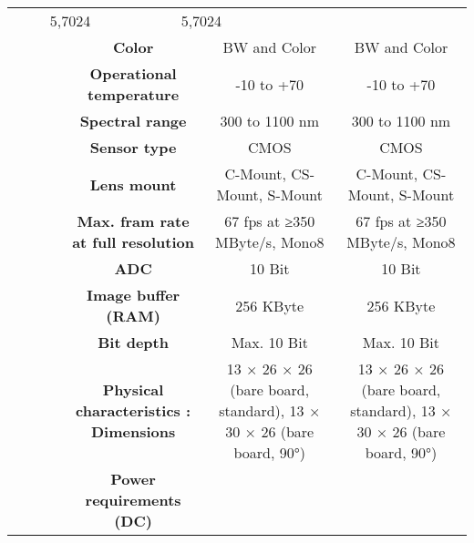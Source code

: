 \begin{table}[H]
{\begin{tabular}{ccc|cc|cc|}
  \multicolumn{2}{c|}{5,7024} &
  \multicolumn{2}{c|}{5,7024} \\
\multicolumn{1}{|c|}{} &
  \multicolumn{2}{c|}{\cellcolor[HTML]{EFEFEF}\textbf{Color}} &
  \multicolumn{2}{c|}{\cellcolor[HTML]{EFEFEF}BW and Color} &
  \multicolumn{2}{c|}{\cellcolor[HTML]{EFEFEF}BW and Color} \\
\multicolumn{1}{|c|}{} &
  \multicolumn{2}{c|}{\textbf{Operational temperature}} &
  \multicolumn{2}{c|}{-10 to +70} &
  \multicolumn{2}{c|}{-10 to +70} \\
\multicolumn{1}{|c|}{} &
  \multicolumn{2}{c|}{\cellcolor[HTML]{EFEFEF}\textbf{Spectral range}} &
  \multicolumn{2}{c|}{\cellcolor[HTML]{EFEFEF}300 to 1100 nm} &
  \multicolumn{2}{c|}{\cellcolor[HTML]{EFEFEF}300 to 1100 nm} \\
\multicolumn{1}{|c|}{} &
  \multicolumn{2}{c|}{\textbf{Sensor type}} &
  \multicolumn{2}{c|}{CMOS} &
  \multicolumn{2}{c|}{CMOS} \\
\multicolumn{1}{|c|}{} &
  \multicolumn{2}{c|}{\cellcolor[HTML]{EFEFEF}\textbf{Lens mount}} &
  \multicolumn{2}{c|}{\cellcolor[HTML]{EFEFEF}C-Mount, CS-Mount, S-Mount} &
  \multicolumn{2}{c|}{\cellcolor[HTML]{EFEFEF}C-Mount, CS-Mount, S-Mount} \\
\multicolumn{1}{|c|}{} &
  \multicolumn{2}{c|}{\textbf{Max. fram rate at full resolution}} &
  \multicolumn{2}{c|}{67 fps at ≥350 MByte/s, Mono8} &
  \multicolumn{2}{c|}{67 fps at ≥350 MByte/s, Mono8} \\
\multicolumn{1}{|c|}{} &
  \multicolumn{2}{c|}{\cellcolor[HTML]{EFEFEF}\textbf{ADC}} &
  \multicolumn{2}{c|}{\cellcolor[HTML]{EFEFEF}10 Bit} &
  \multicolumn{2}{c|}{\cellcolor[HTML]{EFEFEF}10 Bit} \\
\multicolumn{1}{|c|}{} &
  \multicolumn{2}{c|}{\textbf{Image buffer (RAM)}} &
  \multicolumn{2}{c|}{256 KByte} &
  \multicolumn{2}{c|}{256 KByte} \\
\multicolumn{1}{|c|}{} &
  \multicolumn{2}{c|}{\cellcolor[HTML]{EFEFEF}\textbf{Bit depth}} &
  \multicolumn{2}{c|}{\cellcolor[HTML]{EFEFEF}Max. 10 Bit} &
  \multicolumn{2}{c|}{\cellcolor[HTML]{EFEFEF}Max. 10 Bit} \\
\multicolumn{1}{|c|}{} &
  \multicolumn{2}{c|}{\textbf{Physical characteristics : Dimensions}} &
  \multicolumn{2}{c|}{13 × 26 × 26 (bare board, standard), 13 × 30 × 26 (bare board, 90°)} &
  \multicolumn{2}{c|}{13 × 26 × 26 (bare board, standard), 13 × 30 × 26 (bare board, 90°)} \\
\multicolumn{1}{|c|}{} &
  \multicolumn{2}{c|}{\cellcolor[HTML]{EFEFEF}\textbf{Power requirements (DC)}} &

\end{tabular}}
\end{table}
